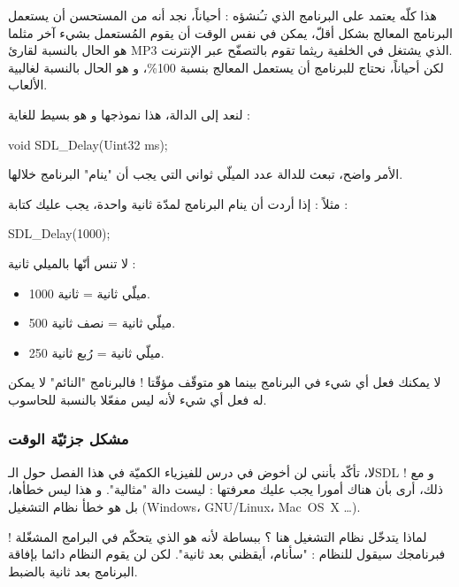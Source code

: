 \begin{information}
هذا كلّه يعتمد على البرنامج الذي تـُنشؤه : أحياناً، نجد أنه من المستحسن أن يستعمل البرنامج المعالج بشكل أقلّ، يمكن في نفس الوقت أن يقوم المُستعمل بشيء آخر مثلما هو الحال بالنسبة لقارئ
\textenglish{MP3}
الذي يشتغل في الخلفية ريثما تقوم بالتصفّح عبر الإنترنت.\\
لكن أحياناً، نحتاج للبرنامج أن يستعمل المعالج بنسبة 100\%، و هو الحال بالنسبة لغالبية الألعاب.
\end{information}

لنعد إلى الدالة، هذا نموذجها و هو بسيط للغاية :

\begin{Csource}
void SDL_Delay(Uint32 ms);
\end{Csource}

الأمر واضح، تبعث للدالة عدد الميلّي ثواني التي يجب أن "ينام" البرنامج خلالها. 

مثلاً : إذا أردت أن ينام البرنامج لمدّة ثانية واحدة، يجب عليك كتابة :

\begin{Csource}
SDL_Delay(1000);
\end{Csource}

 
لا تنس أنّها بالميلي ثانية :

\begin{itemize}
	\item 1000 ميلّي ثانية = ثانية.
	\item 500 ميلّي ثانية = نصف ثانية.
	\item 250 ميلّي ثانية = رُبع ثانية.
\end{itemize}

\begin{warning}
لا يمكنك فعل أي شيء في البرنامج بينما هو متوقّف مؤقّتا ! فالبرنامج "النائم" لا يمكن له فعل أي شيء لأنه ليس مفعّلا بالنسبة للحاسوب.
\end{warning}

\subsubsection{مشكل جزئيّة الوقت}

لا، تأكّد بأنني لن أخوض في درس للفيزياء الكميّة في هذا الفصل حول الـ\textenglish{SDL} !
و مع ذلك، أرى بأن هناك أمورا يجب عليك معرفتها : 
ليست دالة "مثالية". و هذا ليس خطأها، بل هو خطأ نظام التشغيل 
(\textenglish{Windows}، \mbox{\textenglish{GNU/Linux}}، \mbox{\textenglish{Mac OS X}} \dots).

لماذا يتدخّل نظام التشغيل هنا ؟ ببساطة لأنه هو الذي يتحكّم في البرامج المشغّلة ! فبرنامجك سيقول للنظام : "سأنام، أيقظني بعد ثانية". لكن لن يقوم النظام دائما بإفاقة البرنامج بعد ثانية بالضبط.

